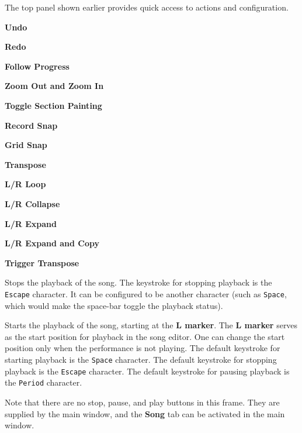    The top panel shown earlier provides quick access to actions
   and configuration.

   \begin{enumber}
      \item \textbf{Undo}
      \item \textbf{Redo}
      \item \textbf{Follow Progress}
      \item \textbf{Zoom Out and Zoom In}
      \item \textbf{Toggle Section Painting}
      \item \textbf{Record Snap}
      \item \textbf{Grid Snap}
      \item \textbf{Transpose}
      \item \textbf{L/R Loop}
      \item \textbf{L/R Collapse}
      \item \textbf{L/R Expand}
      \item \textbf{L/R Expand and Copy}
      \item \textbf{Trigger Transpose}
   \end{enumber}

   \setcounter{ItemCounter}{0}      %

   Stops the playback of the song.
   The keystroke for stopping playback is the \texttt{Escape} character.
   It can be configured to be another character (such as \texttt{Space}, which
   would make the space-bar toggle the playback status).

   Starts the playback of the song, starting at the \textbf{L marker}.
   The \textbf{L marker} serves as the start position for playback
   in the song editor.  One can change the start position only when the
   performance is not playing.
   The default keystroke for starting playback is the \texttt{Space} character.
   The default keystroke for stopping playback is the \texttt{Escape} character.
   The default keystroke for pausing playback is the \texttt{Period} character.

   Note that there are no stop, pause, and play buttons in this frame.
   They are supplied by the main window, and the \textbf{Song} tab can be
   activated in the main window.

